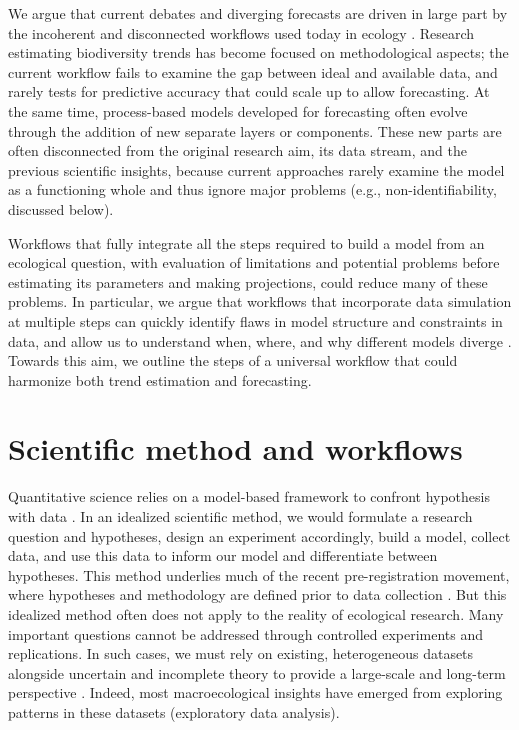 \documentclass[11pt]{article}
\begin{document}
We argue that current debates and diverging forecasts are driven in large part by the incoherent and disconnected workflows used today in ecology \citep{Loreau2022, Talis2023, Johnson2024}. Research estimating biodiversity trends has become focused on methodological aspects; the current workflow fails to examine the gap between ideal and available data, and rarely tests for predictive accuracy that could scale up to allow forecasting. At the same time, process-based models developed for forecasting often evolve through the addition of new separate layers or components. These new parts are often disconnected from the original research aim, its data stream, and the previous scientific insights, because current approaches rarely examine the model as a functioning whole and thus ignore major problems (e.g., non-identifiability, discussed below).

Workflows that fully integrate all the steps required to build a model from an ecological question, with evaluation of limitations and potential problems before estimating its parameters and making projections, could reduce many of these problems. In particular, we argue that workflows that incorporate data simulation at multiple steps can quickly identify flaws in model structure and constraints in data, and allow us to understand when, where, and why different models diverge \citep{McElreath2018, betanworkflow, Gelman2020, Wolkovich2024}. Towards this aim, we outline the steps of a universal workflow that could harmonize both trend estimation and forecasting.

\section{Scientific method and workflows}

Quantitative science relies on a model-based framework to confront hypothesis with data \citep{Chamberlin:1965cd}. In an idealized scientific method, we would formulate a research question and hypotheses, design an experiment accordingly, build a model, collect data, and use this data to inform our model and differentiate between hypotheses. This method underlies much of the recent pre-registration movement, where hypotheses and methodology are defined prior to data collection \citep{Nosek2018}.
But this idealized method often does not apply to the reality of ecological research. Many important questions cannot be addressed through controlled experiments and replications. In such cases, we must rely on existing, heterogeneous datasets alongside uncertain and incomplete theory to provide a large-scale and long-term perspective \citep{Hilborn1997}. Indeed, most macroecological insights have emerged from exploring patterns in these datasets (exploratory data analysis).
\end{document}
